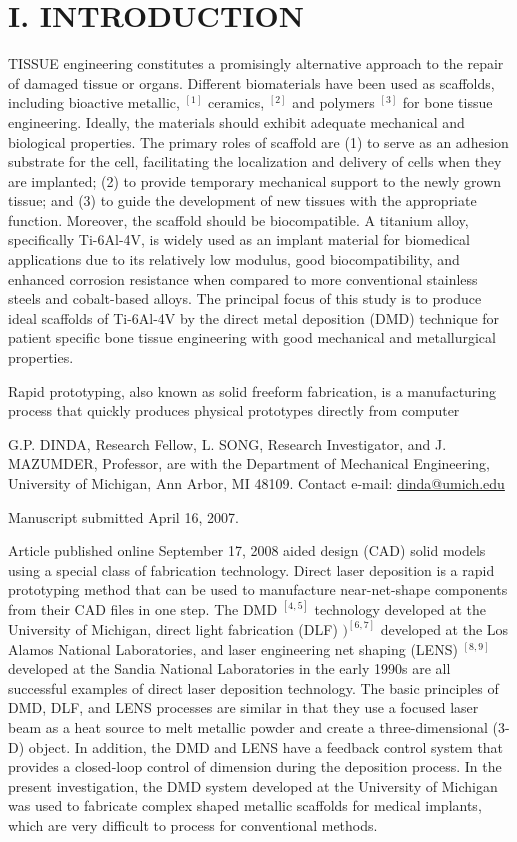 \documentclass[10pt]{article}
\begin{document}
\section*{I. INTRODUCTION}
TISSUE engineering constitutes a promisingly alternative approach to the repair of damaged tissue or organs. Different biomaterials have been used as scaffolds, including bioactive metallic, ${ }^{[1]}$ ceramics, ${ }^{[2]}$ and polymers ${ }^{[3]}$ for bone tissue engineering. Ideally, the materials should exhibit adequate mechanical and biological properties. The primary roles of scaffold are (1) to serve as an adhesion substrate for the cell, facilitating the localization and delivery of cells when they are implanted; (2) to provide temporary mechanical support to the newly grown tissue; and (3) to guide the development of new tissues with the appropriate function. Moreover, the scaffold should be biocompatible. A titanium alloy, specifically Ti-6Al-4V, is widely used as an implant material for biomedical applications due to its relatively low modulus, good biocompatibility, and enhanced corrosion resistance when compared to more conventional stainless steels and cobalt-based alloys. The principal focus of this study is to produce ideal scaffolds of Ti-6Al-4V by the direct metal deposition (DMD) technique for patient specific bone tissue engineering with good mechanical and metallurgical properties.

Rapid prototyping, also known as solid freeform fabrication, is a manufacturing process that quickly produces physical prototypes directly from computer

G.P. DINDA, Research Fellow, L. SONG, Research Investigator, and J. MAZUMDER, Professor, are with the Department of Mechanical Engineering, University of Michigan, Ann Arbor, MI 48109. Contact e-mail: \href{mailto:dinda@umich.edu}{dinda@umich.edu}

Manuscript submitted April 16, 2007.

Article published online September 17, 2008 aided design (CAD) solid models using a special class of fabrication technology. Direct laser deposition is a rapid prototyping method that can be used to manufacture near-net-shape components from their CAD files in one step. The DMD ${ }^{[4,5]}$ technology developed at the University of Michigan, direct light fabrication (DLF) $)^{[6,7]}$ developed at the Los Alamos National Laboratories, and laser engineering net shaping (LENS) ${ }^{[8,9]}$ developed at the Sandia National Laboratories in the early 1990s are all successful examples of direct laser deposition technology. The basic principles of DMD, DLF, and LENS processes are similar in that they use a focused laser beam as a heat source to melt metallic powder and create a three-dimensional (3-D) object. In addition, the DMD and LENS have a feedback control system that provides a closed-loop control of dimension during the deposition process. In the present investigation, the DMD system developed at the University of Michigan was used to fabricate complex shaped metallic scaffolds for medical implants, which are very difficult to process for conventional methods.
\end{document}
